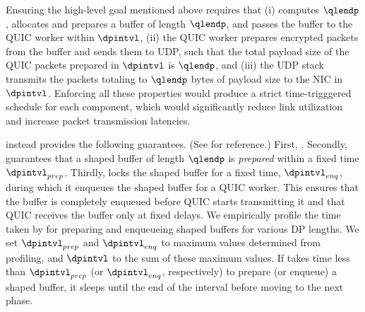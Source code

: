 Ensuring the high-level goal mentioned above requires that
(i) {\prepare} computes $\qlendp$, allocates and prepares a buffer of length
$\qlendp$, and passes the buffer to the QUIC worker within $\dpintvl$,
(ii) the QUIC worker prepares encrypted packets from the buffer and sends them
to UDP, such that the total payload size of the QUIC packets prepared in
$\dpintvl$ is $\qlendp$, and
(iii) the UDP stack transmits the packets totaling to $\qlendp$ bytes of payload
size to the NIC in $\dpintvl$.
Enforcing all these properties would produce a strict time-trigggered schedule
for each component, which would significantly reduce link utilization and
increase packet transmission latencies.

{\dshaper} instead provides the following guarantees. (See
 for reference.)
First, {\prepare} .
Secondly, {\prepare} guarantees that a shaped buffer of length $\qlendp$ is {\em
prepared} within a fixed time $\dpintvl_{prep}$.
Thirdly, {\prepare} locks the shaped buffer for a fixed time,
$\dpintvl_{enq}$, during which it enqueues the shaped buffer for a QUIC
worker.
This ensures that the buffer is completely enqueued before QUIC starts
transmitting it and that
QUIC receives the buffer only at fixed delays.
We empirically profile the time taken by {\prepare} for preparing and enqueueing
shaped buffers for various DP lengths. We set $\dpintvl_{prep}$ and
$\dpintvl_{enq}$ to maximum values determined from profiling, and $\dpintvl$ to
the sum of these maximum values. If {\prepare} takes time less than
$\dpintvl_{prep}$ (or $\dpintvl_{enq}$, respectively) to prepare (or enqueue) a
shaped buffer, it sleeps until the end of the interval before moving to the next
phase.


